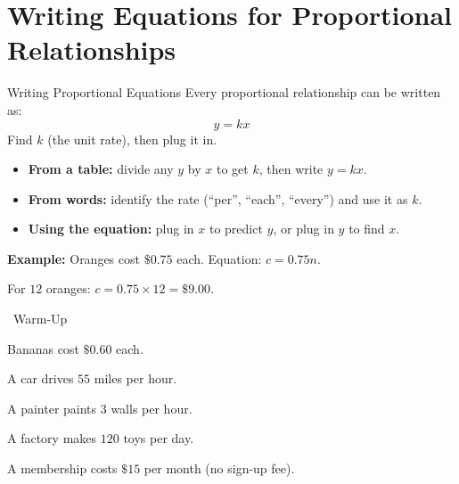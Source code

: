 \section{Writing Equations for Proportional Relationships}

\begin{quickReview}{Writing Proportional Equations}
Every proportional relationship can be written as:
$$y = kx$$
Find $k$ (the unit rate), then plug it in.

\begin{itemize}[leftmargin=*]
    \item \textbf{From a table:} divide any $y$ by $x$ to get $k$, then write $y = kx$.
    \item \textbf{From words:} identify the rate (``per'', ``each'', ``every'') and use it as $k$.
    \item \textbf{Using the equation:} plug in $x$ to predict $y$, or plug in $y$ to find $x$.
\end{itemize}

\medskip
\textbf{Example:} Oranges cost $\$0.75$ each. Equation: $c = 0.75n$.

For $12$ oranges: $c = 0.75 \times 12 = \$9.00$.
\end{quickReview}

\begin{practiceBox}[funGreen]{\faSun~Warm-Up}


\prob Bananas cost $\$0.60$ each. \answerBlank[4cm]

\prob A car drives $55$ miles per hour. \answerBlank[4cm]

\prob A painter paints $3$ walls per hour. \answerBlank[4cm]

\prob A factory makes $120$ toys per day. \answerBlank[4cm]

\prob A membership costs $\$15$ per month (no sign-up fee). \answerBlank[4cm]
\end{practiceBox}

